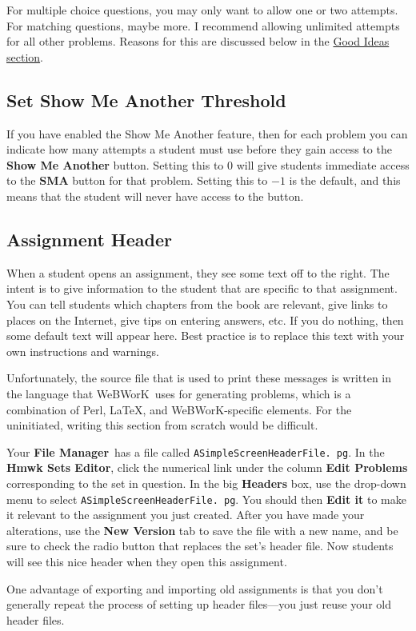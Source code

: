 \documentclass[12pt]{article}
\newcommand{\menu}[1]{\textbf{#1}}
\newcommand{\WW}{WeBWorK}
\newcommand{\HSE}{\menu{Hmwk Sets Editor}}
\newcommand{\FM}{\menu{File Manager}}
\begin{document}
For multiple choice questions, you may only want to allow one or two attempts.
For matching questions, maybe more.
I recommend allowing unlimited attempts for all other problems.
Reasons for this are discussed below in the \hyperref[goodideas]{Good Ideas section}.

\subsection{Set Show Me Another Threshold}
If you have enabled the Show Me Another feature, then for each problem you can indicate how many attempts a student must use before they gain access to the \menu{Show Me Another} button.
Setting this to $0$ will give students immediate access to the \menu{SMA} button for that problem.
Setting this to $-1$ is the default, and this means that the student will never have access to the button.

\subsection{Assignment Header}
When a student opens an assignment, they see some text off to the right.
The intent is to give information to the student that are specific to that assignment.
You can tell students which chapters from the book are relevant, give links to places on the Internet, give tips on entering answers, etc.
If you do nothing, then some default text will appear here.
Best practice is to replace this text with your own instructions and warnings.

Unfortunately, the source file that is used to print these messages is written in the language that \WW\ uses for generating problems, which is a combination of Perl, \LaTeX, and \WW-specific elements.
For the uninitiated, writing this section from scratch would be difficult.

Your \FM\  has a file called \texttt{ASimpleScreenHeaderFile.
	pg}.
In the \HSE, click the numerical link under the column \menu{Edit Problems} corresponding to the set in question.
In the big \menu{Headers} box, use the drop-down menu to select \texttt{ASimpleScreenHeaderFile.
	pg}.
You should then \menu{Edit it} to make it relevant to the assignment you just created.
After you have made your alterations, use the \menu{New Version} tab to save the file with a new name, and be sure to check the radio button that replaces the set's header file.
Now students will see this nice header when they open this assignment.

One advantage of exporting and importing old assignments is that you don't generally repeat the process of setting up header files---you just reuse your old header files.
\end{document}
